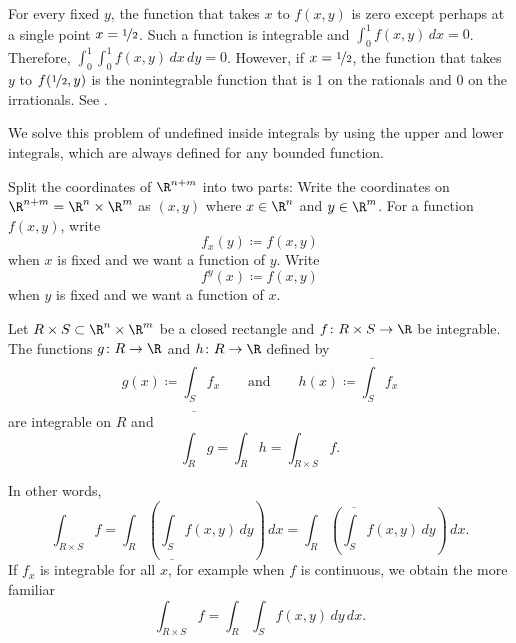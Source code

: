 \begin{example}
For every fixed $y$, the function that takes $x$ to $f(x,y)$ is zero except
perhaps at a single point $x=\nicefrac{1}{2}$.  Such a
function is integrable and $\int_0^1 f(x,y) \, dx = 0$.  Therefore,
$\int_0^1 \int_0^1 f(x,y) \, dx \, dy = 0$.
However, if $x=\nicefrac{1}{2}$, the function that takes $y$ to
$f(\nicefrac{1}{2},y)$ is the nonintegrable function that is
1 on the rationals and 0 on the irrationals.
See .
\end{example}

We solve this problem of undefined inside integrals
by using the upper and lower integrals, which are always defined
for any bounded function.

\medskip

Split the coordinates of $\R^{n+m}$ into two parts:
Write the coordinates on $\R^{n+m} = \R^n \times \R^m$ as
$(x,y)$ where $x \in \R^n$ and $y \in \R^m$.  For a function $f(x,y)$,
write
\begin{equation*}
f_x(y) \coloneqq f(x,y)
\end{equation*}
when $x$ is fixed and we want a function of $y$.
Write
\begin{equation*}
f^y(x) \coloneqq f(x,y)
\end{equation*}
when $y$ is fixed and we want a function of $x$.

\begin{thm} \label{mv:fubinivA} 
Let $R \times S \subset \R^n \times \R^m$ be a closed rectangle and
$f \colon R \times S \to \R$ be integrable.
The functions $g \colon R \to \R$ and $h \colon R \to \R$ defined by
\begin{equation*}
g(x) \coloneqq \underline{\int_S} f_x \qquad
\text{and} \qquad
h(x) \coloneqq \overline{\int_S} f_x 
\end{equation*}
are integrable on $R$ and
\begin{equation*}
\int_R g = \int_R h = \int_{R \times S} f .
\end{equation*}
\end{thm}

In other words,
\begin{equation*}
\int_{R \times S} f
=
 \int_R \left(
 \underline{\int_S} f(x,y) \, dy
\right) \, dx
=
 \int_R \left(
 \overline{\int_S} f(x,y) \, dy
\right) \, dx .
\end{equation*}
If $f_x$ is integrable for all $x$, for example when
$f$ is continuous, we obtain the more familiar
\begin{equation*}
\int_{R \times S} f
=
 \int_R \int_S f(x,y) \, dy \, dx .
\end{equation*}

